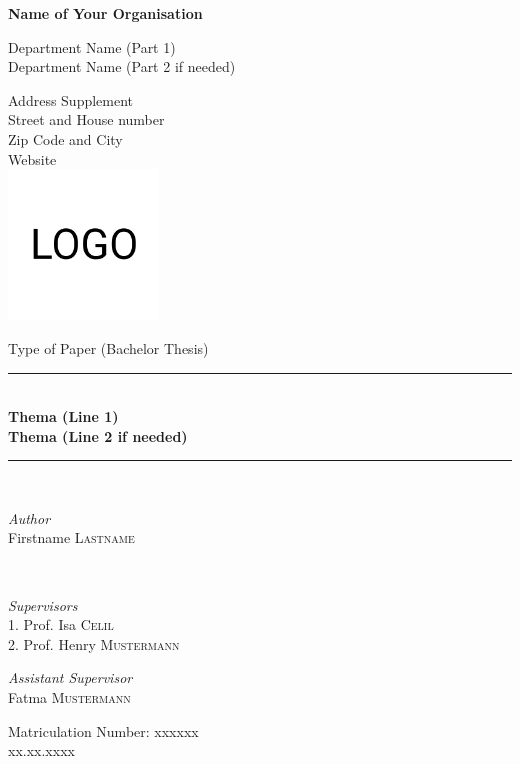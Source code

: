 \documentclass[11pt,oneside,a4paper]{book}
\begin{document}
\begin{titlepage}
	\newcommand{\HRule}{\rule{\linewidth}{0.5mm}}
	\center

{\LARGE \textbf{Name of Your Organisation}}

\vspace{0.5cm}

{\large Department Name (Part 1)\\[1mm]}
{\large Department Name (Part 2 if needed)\\[5mm]}

Address Supplement\\
Street and House number \\
Zip Code and City\\
Website\\ [1.0cm]
\includegraphics[width=4cm]{resources/logo.png}

\vspace*{1.0cm}

{\LARGE Type of Paper (Bachelor Thesis)}\\ [1.0cm]

	\HRule\\[0.4cm]
{\LARGE \textbf{Thema (Line 1)}}\\
\vspace*{0.3cm}
{\LARGE \textbf{Thema (Line 2 if needed)}}\\
	\HRule\\[1cm]
	\begin{minipage}{0.4\textwidth}
		\begin{flushleft}
			\large
			\textit{Author}\\
			Firstname \textsc{Lastname}\\
		\end{flushleft}
	\end{minipage}
	~
	\begin{minipage}{0.4\textwidth}
		\begin{flushright}
			\large
			\textit{Supervisors}\\
			1. Prof. Isa \textsc{Celil}\\ %
			2. Prof. Henry \textsc{Mustermann}
			
			\textit{Assistant Supervisor}\\
			Fatma \textsc{Mustermann}\\ %
		\end{flushright}
	\end{minipage}

	
	\vfill\vfill\vfill
    
	\large Matriculation Number: xxxxxx\\[0.5cm] 
	
	{\large xx.xx.xxxx}
\end{titlepage}
\end{document}
